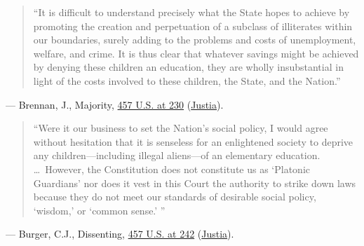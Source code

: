 \documentclass[12pt]{article}
\begin{document}
\begin{quote}
``It is difficult to understand precisely what the State hopes to achieve by promoting the creation and perpetuation of a subclass of illiterates within our boundaries, surely adding to the problems and costs of unemployment, welfare, and crime. It is thus clear that whatever savings might be achieved by denying these children an education, they are wholly insubstantial in light of the costs involved to these children, the State, and the Nation.''
\end{quote}
\noindent --- Brennan, J., Majority, \href{https://www.law.cornell.edu/supremecourt/text/457/202}{457 U.S. at 230} (\href{https://supreme.justia.com/cases/federal/us/457/202/}{Justia}).

\begin{quote}
``Were it our business to set the Nation's social policy, I would agree without hesitation that it is senseless for an enlightened society to deprive any children---including illegal aliens---of an elementary education. \ldots\ However, the Constitution does not constitute us as `Platonic Guardians' nor does it vest in this Court the authority to strike down laws because they do not meet our standards of desirable social policy, `wisdom,' or `common sense.' ''
\end{quote}
\noindent --- Burger, C.J., Dissenting, \href{https://www.law.cornell.edu/supremecourt/text/457/202}{457 U.S. at 242} (\href{https://supreme.justia.com/cases/federal/us/457/202/}{Justia}).
\end{document}
